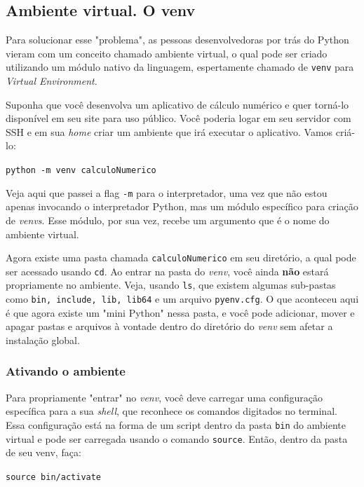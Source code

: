 \documentclass{article}
\begin{document}
	\subsection{Ambiente virtual. O venv} 

	Para solucionar esse "problema", as pessoas desenvolvedoras por trás do Python vieram com um conceito chamado ambiente
	virtual, o qual pode ser criado utilizando um módulo nativo da linguagem, espertamente chamado de \texttt{venv} para 
	\textit{Virtual Environment}.

	Suponha que você desenvolva um aplicativo de cálculo numérico e quer torná-lo disponível em seu site para uso público.
	Você poderia logar em seu servidor com SSH e em sua \textit{home} criar um ambiente que irá executar o aplicativo. 
	Vamos criá-lo: 
	
	\vspace{1ex}
	\texttt{python -m venv calculoNumerico} 
	\vspace{1ex} 

	Veja aqui que passei a flag \texttt{-m} para o interpretador, uma vez que não estou apenas invocando o interpretador Python,
	mas um módulo específico para criação de \textit{venvs}. Esse módulo, por sua vez, recebe um argumento que é o nome do 
	ambiente virtual.

	Agora existe uma pasta chamada \texttt{calculoNumerico} em seu diretório, a qual pode ser acessado usando \texttt{cd}. 
	Ao entrar na pasta do \textit{venv}, você ainda \textbf{não} estará propriamente no ambiente. Veja, usando \texttt{ls},
	que existem algumas sub-pastas como \texttt{bin, include, lib, lib64} e um arquivo \texttt{pyenv.cfg}. O que aconteceu aqui
	é que agora existe um "mini Python" nessa pasta, e você pode adicionar, mover e apagar pastas e arquivos à vontade dentro
	do diretório do \textit{venv} sem afetar a instalação global. 

	\subsubsection{Ativando o ambiente} 

	Para propriamente "entrar" no \textit{venv}, você deve carregar uma configuração específica para a sua \textit{shell}, que
	reconhece os comandos digitados no terminal. Essa configuração está na forma de um script dentro da pasta \texttt{bin} do
	ambiente virtual e pode ser carregada usando o comando \texttt{source}. Então, dentro da pasta de seu venv, faça:

	\vspace{1ex}
	\texttt{source bin/activate}
	\vspace{1ex} 
\end{document}

